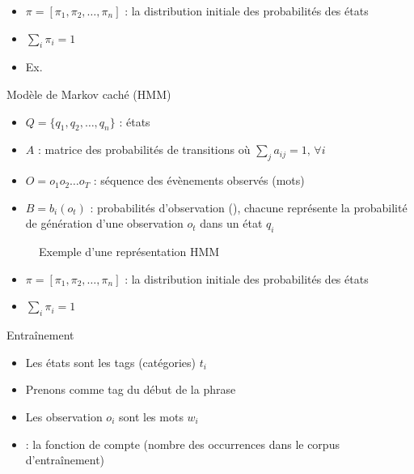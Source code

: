 \documentclass{KodeBook}
\begin{document}
\begin{itemize}
	\item $\pi = [\pi_1, \pi_2, \ldots, \pi_n ]$ : la distribution initiale des probabilités des états
	\item $\sum_i \pi_i = 1$
	\item Ex. 
\end{itemize}

Modèle de Markov caché (HMM)

\begin{minipage}{.54\textwidth}
	\begin{itemize}
		\item $Q = \{q_1, q_2, \ldots, q_n\}$ : états
		\item $A$ : matrice des probabilités de transitions où $\sum_j a_{ij} = 1,\, \forall i$
		\item $O = o_1 o_2 \ldots o_T$ : séquence des évènements observés (mots)
		\item $B = b_i(o_t)$ : probabilités d'observation (), chacune représente la probabilité de génération d'une observation $o_t$ dans un état $q_i$
	\end{itemize}
\end{minipage}
\begin{figure}
	\caption{Exemple d'une représentation HMM \cite{2019-jurafsky-martin}}
\end{figure}

\begin{itemize}
	\item $\pi = [\pi_1, \pi_2, \ldots, \pi_n ]$ : la distribution initiale des probabilités des états
	\item $\sum_i \pi_i = 1$
\end{itemize}

Entraînement

\begin{itemize}
	\item Les états sont les tags (catégories) $t_i$
	\item Prenons  comme tag du début de la phrase
	\item Les observation $o_i$ sont les mots $w_i$
	\item {} : la fonction de compte (nombre des occurrences dans le corpus d'entraînement)
\end{itemize}
\end{document}
